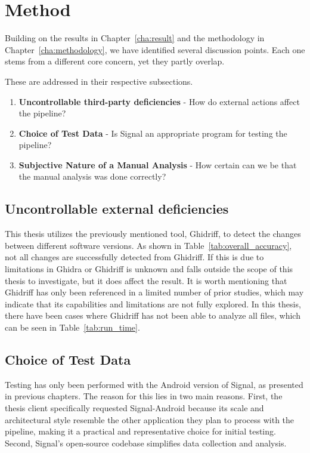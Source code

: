 \section{Method}
\label{sec:discussion-method}

Building on the results in Chapter~\ref{cha:result} and the methodology in Chapter~\ref{cha:methodology}, we have identified several discussion points. Each one stems from a different core concern, yet they partly overlap. 

\begin{explanation}
    These are addressed in their respective subsections.
    \begin{enumerate}    
        \item \textbf{Uncontrollable third-party deficiencies} - How do external actions affect the pipeline?

        \item \textbf{Choice of Test Data} - Is Signal an appropriate program for testing the pipeline?
    
        \item \textbf{Subjective Nature of a Manual Analysis} - How certain can we be that the manual analysis was done correctly?

    \end{enumerate}
\end{explanation}

\subsection{Uncontrollable external deficiencies}
This thesis utilizes the previously mentioned tool, Ghidriff, to detect the changes between different software versions. As shown in Table~\ref{tab:overall_accuracy}, not all changes are successfully detected from Ghidriff. If this is due to limitations in Ghidra or Ghidriff is unknown and falls outside the scope of this thesis to investigate, but it does affect the result. It is worth mentioning that Ghidriff has only been referenced in a limited number of prior studies, which may indicate that its capabilities and limitations are not fully explored. In this thesis, there have been cases where Ghidriff has not been able to analyze all  files, which can be seen in Table~\ref{tab:run_time}.

\subsection{Choice of Test Data}
Testing has only been performed with the Android version of Signal, as presented in previous chapters. The reason for this lies in two main reasons. First, the thesis client specifically requested Signal-Android because its scale and architectural style resemble the other application they plan to process with the pipeline, making it a practical and representative choice for initial testing. Second, Signal’s open-source codebase simplifies data collection and analysis.


